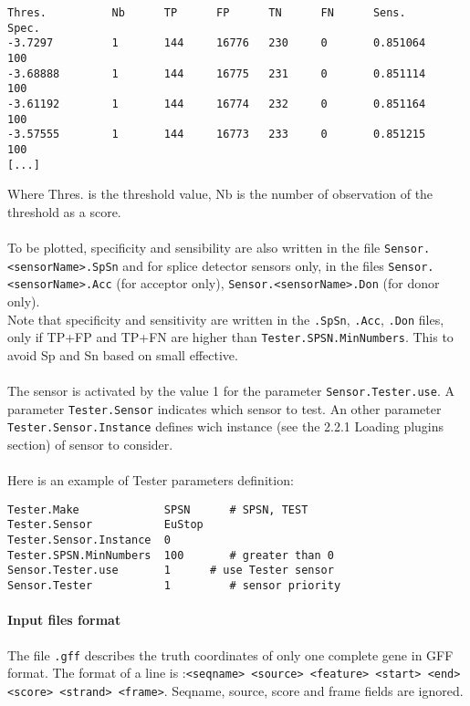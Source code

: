 \begin{Verbatim}[fontsize=\small]
Thres.          Nb      TP      FP      TN      FN      Sens.           Spec.
-3.7297         1       144     16776   230     0       0.851064        100
-3.68888        1       144     16775   231     0       0.851114        100
-3.61192        1       144     16774   232     0       0.851164        100
-3.57555        1       144     16773   233     0       0.851215        100
[...]
\end{Verbatim}
Where Thres. is the threshold value, Nb is the number of observation of the threshold as a score.\\ 
\\ 
To be plotted, specificity and sensibility are also written in the file \texttt{Sensor.<sensorName>.SpSn} and for splice detector sensors only, in the files 
\texttt{Sensor.<sensorName>.Acc} (for acceptor only), \texttt{Sensor.<sensorName>.Don} (for donor only).\\ 
Note that specificity and sensitivity are written in the \texttt{.SpSn}, \texttt{.Acc}, \texttt{.Don} files, only if TP+FP and TP+FN are higher than \texttt{Tester.SPSN.MinNumbers}. This to avoid Sp and Sn based on small effective.\\
\\
The sensor is activated by the value 1 for the parameter
\texttt{Sensor.Tester.use}. A parameter \texttt{Tester.Sensor} indicates which sensor to test. An other parameter \texttt{Tester.Sensor.Instance} defines wich instance (see the 2.2.1 Loading plugins section) of sensor to consider.\\
\\
Here is an example of Tester parameters definition:
\begin{Verbatim}[fontsize=\small]
Tester.Make             SPSN      # SPSN, TEST
Tester.Sensor           EuStop
Tester.Sensor.Instance  0
Tester.SPSN.MinNumbers  100       # greater than 0
Sensor.Tester.use       1      # use Tester sensor
Sensor.Tester           1         # sensor priority
\end{Verbatim}

\paragraph{Input files format}

The file \texttt{.gff} describes the truth coordinates of only one complete gene in GFF format. The format of a
line is :\texttt{<seqname> <source> <feature> <start> <end> <score> <strand> <frame>}. Seqname, source, score and frame fields are ignored.

